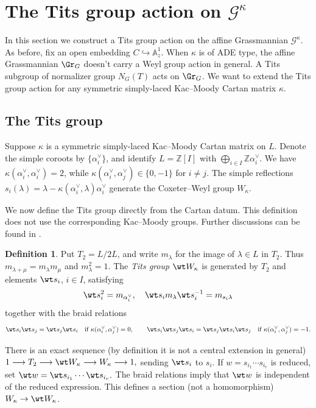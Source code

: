 \documentclass{amsart}
\numberwithin{equation}{section}
\numberwithin{figure}{section}
\theoremstyle{definition}
\newtheorem{defn}[thm]{Definition}
\theoremstyle{remark}
\renewcommand{\c}[1]{\mathcal{#1}}
\renewcommand{\b}[1]{\mathbb{#1}}
\begin{document}
\section{The Tits group action on $\c G^\kappa$}
\label{sec:tits-revised}
In this section we construct a Tits group action on the affine Grassmannian  $\c G^\kappa$. As before, fix an open embedding $C\hookrightarrow\b A^1_z$.
When $\kappa$ is of ADE type, the affine Grassmannian $\Gr_G$ doesn't carry a Weyl group action in general. A Tits subgroup of normalizer group $N_G(T)$ acts on $\Gr_G$. We want to extend the Tits group action for any symmetric simply-laced Kac--Moody Cartan matrix $\kappa$.


\subsection{The Tits group}
Suppose $\kappa$ is a symmetric simply-laced Kac--Moody Cartan matrix on $L$. Denote the simple coroots by $\{\alpha_i^\vee\}$, and identify $L=\b Z[I]$ with $\bigoplus_{i\in I}\b Z\alpha_i^\vee$. We have
$\kappa(\alpha_i^\vee,\alpha_i^\vee)=2$, while
$\kappa(\alpha_i^\vee,\alpha_j^\vee)\in\{0,-1\}$ for $i\ne j$.
The simple reflections $s_i(\lambda)=\lambda-
\kappa(\alpha_i^\vee,\lambda)\alpha_i^\vee$
generate the Coxeter--Weyl group $W_\kappa$.



We now define the Tits group directly from the Cartan datum. This definition does not use the corresponding Kac--Moody groups. Further discussions can be found in \cite[\S1.2]{ganapathy2024tits}.

\begin{defn}
	Put $T_2=L/2L$, and write $m_\lambda$ for the image of
	$\lambda\in L$ in $T_2$.  Thus
	$m_{\lambda+\mu}=m_\lambda m_\mu$ and $m_\lambda^2=1$.
	The \emph{Tits group} $\wt W_\kappa$ is generated by $T_2$ and elements
	$\wt s_i$, $i\in I$, satisfying
$$\wt s_i^2=m_{\alpha_i^\vee},\quad \wt s_i m_\lambda\wt s_i^{-1}=m_{s_i\lambda}$$
together with the braid relations
\[
\begin{aligned}
	\wt s_i\wt s_j=\wt s_j\wt s_i
	&&\text{if }\kappa(\alpha_i^\vee,\alpha_j^\vee)=0,
	\qquad
	\wt s_i\wt s_j\wt s_i=\wt s_j\wt s_i\wt s_j
	&&\text{if }\kappa(\alpha_i^\vee,\alpha_j^\vee)=-1.
\end{aligned}
\]
\end{defn}

There is an exact sequence (by definition it is not a central extension in general)
$	1\longrightarrow T_2\longrightarrow\wt W_\kappa
\longrightarrow W_\kappa\longrightarrow1,$
sending $\wt s_i$ to $s_i$.  
If $w=s_{i_1}\cdots s_{i_r}$ is reduced, set
$\wt w=\wt s_{i_1}\cdots\wt s_{i_r}.$
The braid relations imply that $\wt w$ is independent of the reduced
expression.  This defines a section (not a homomorphism) $W_\kappa\to\wt W_\kappa$.
\end{document}
